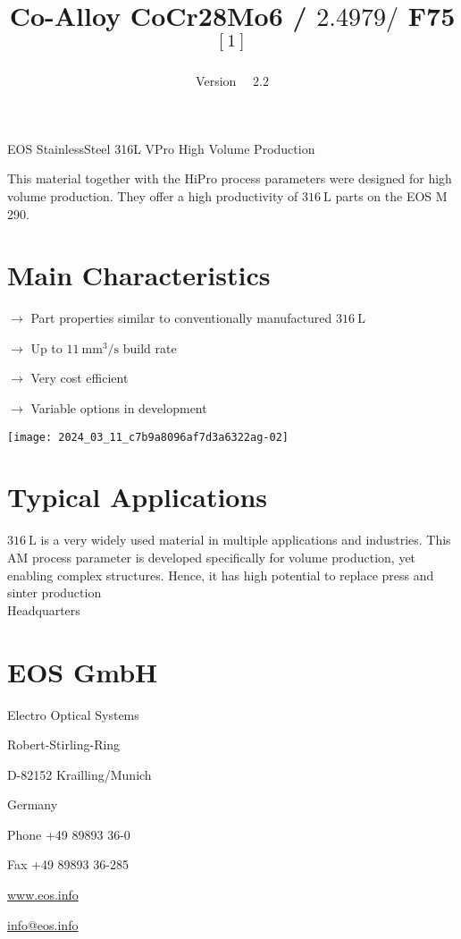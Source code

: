 \documentclass[10pt]{article}
\title{Co-Alloy CoCr28Mo6 / $2.4979 /$ F75 ${ }^{[1]}$ }
\author{Version $\quad 2.2$}
\date{}
\begin{document}
\maketitle
EOS StainlessSteel 316L VPro High Volume Production

This material together with the HiPro process parameters were designed for high volume production. They offer a high productivity of $316 \mathrm{~L}$ parts on the EOS M 290.

\section*{Main Characteristics}
$\longrightarrow$ Part properties similar to conventionally manufactured $316 \mathrm{~L}$

$\longrightarrow$ Up to $11 \mathrm{~mm}^{3} / \mathrm{s}$ build rate

$\longrightarrow$ Very cost efficient

$\longrightarrow$ Variable options in development

\begin{center}
\texttt{[image: 2024\_03\_11\_c7b9a8096af7d3a6322ag-02]}
\end{center}

\section*{Typical Applications}
$316 \mathrm{~L}$ is a very widely used material in multiple applications and industries. This AM process parameter is developed specifically for volume production, yet enabling complex structures. Hence, it has high potential to replace press and sinter production\\
Headquarters

\section*{EOS GmbH}
Electro Optical Systems

Robert-Stirling-Ring

D-82152 Krailling/Munich

Germany

Phone +49 89893 36-0

Fax +49 89893 36-285

\href{http://www.eos.info}{www.eos.info}

\href{mailto:info@eos.info}{info@eos.info}
\end{document}
